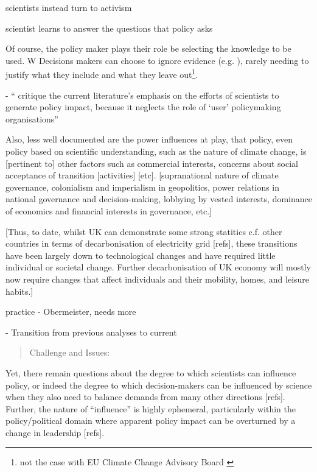 scientists instead turn to activism \cite{Pivovarchuk2024,GregoryBW2024}

scientist learns to answer the questions that policy asks \cite{Gerber2023}

Of course, the policy maker plays their role be selecting the knowledge to be used. W  Decisions makers can choose to ignore evidence (e.g. \cite{TennoyHLN2016}), rarely needing to justify what they include and what they leave out\footnote{not the case with EU Climate Change Advisory Board \cite{WardmanE2023}}.

\cite{EdlerKB2022} - `` critique the current literature's emphasis on the efforts of scientists to generate policy impact, because it neglects the role of `user' policymaking organisations''

Also, less well documented are the power influences at play, that policy, even policy based on scientific understanding, such as the nature of climate change, is [pertinent to] other factors such as commercial interests, concerns about social acceptance of transition [activities] [etc]. [supranational nature of climate governance, colonialism and imperialism in geopolitics, power relations in national governance and decision-making, lobbying by vested interests, dominance of economics and financial interests in governance, etc.]

[Thus, to date, whilst UK can demonstrate some strong statitics c.f. other countries in terms of decarbonisation of electricity grid [refs], these transitions have been largely down to technological changes and have required little individual or societal change. Further decarbonisation of UK economy will mostly now require changes that affect individuals and their mobility, homes, and leisure habits.]




practice - Obermeister, needs more

 - Transition from previous analyses to current

\begin{quote}
Challenge and Issues:    
\end{quote}

Yet, there remain questions about the degree to which scientists can influence policy, or indeed the degree to which decision-makers can be influenced by science when they also need to balance demands from many other directions [refs]. Further, the nature of “influence” is highly ephemeral, particularly within the policy/political domain where apparent policy impact can be overturned by a change in leadership [refs].

